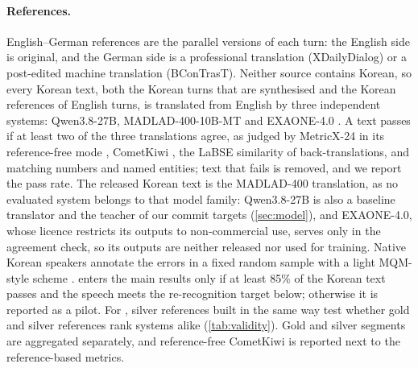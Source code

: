 \paragraph{References.}
English--German references are the parallel versions of each turn: the English side is original, and the German side is a professional translation (XDailyDialog) or a post-edited machine translation (BConTrasT). Neither source contains Korean, so every Korean text, both the Korean turns that are synthesised and the Korean references of English turns, is translated from English by three independent systems: Qwen3.8-27B, MADLAD-400-10B-MT \citep{kudugunta2023madlad} and EXAONE-4.0 \citep{lgai2025exaone4}. A text passes if at least two of the three translations agree, as judged by MetricX-24 in its reference-free mode \citep{juraska2024metricx}, CometKiwi \citep{rei2022cometkiwi}, the LaBSE similarity \citep{feng2022labse} of back-translations, and matching numbers and named entities; text that fails is removed, and we report the pass rate. The released Korean text is the MADLAD-400 translation, as no evaluated system belongs to that model family: Qwen3.8-27B is also a baseline translator and the teacher of our commit targets (\cref{sec:model}), and EXAONE-4.0, whose licence restricts its outputs to non-commercial use, serves only in the agreement check, so its outputs are neither released nor used for training.
Native Korean speakers annotate the errors in a fixed random sample with a light MQM-style scheme \citep{freitag2021experts}.  enters the main results only if at least 85\% of the Korean text passes and the speech meets the re-recognition target below; otherwise it is reported as a pilot. For , silver references built in the same way test whether gold and silver references rank systems alike (\cref{tab:validity}). Gold and silver segments are aggregated separately, and reference-free CometKiwi is reported next to the reference-based metrics.

